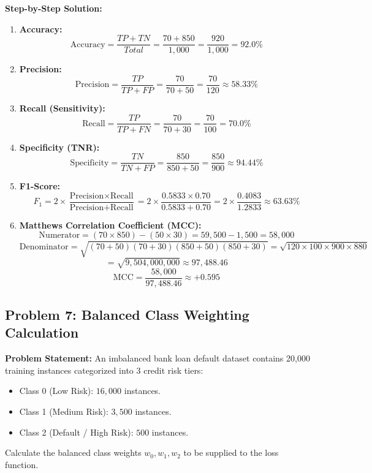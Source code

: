\textbf{Step-by-Step Solution:}
\begin{enumerate}[label=(\alph*)]
    \item \textbf{Accuracy:}
    \[
    \text{Accuracy} = \frac{TP + TN}{Total} = \frac{70 + 850}{1,000} = \frac{920}{1,000} = \mathbf{92.0\%}
    \]
    \item \textbf{Precision:}
    \[
    \text{Precision} = \frac{TP}{TP + FP} = \frac{70}{70 + 50} = \frac{70}{120} \approx \mathbf{58.33\%}
    \]
    \item \textbf{Recall (Sensitivity):}
    \[
    \text{Recall} = \frac{TP}{TP + FN} = \frac{70}{70 + 30} = \frac{70}{100} = \mathbf{70.0\%}
    \]
    \item \textbf{Specificity (TNR):}
    \[
    \text{Specificity} = \frac{TN}{TN + FP} = \frac{850}{850 + 50} = \frac{850}{900} \approx \mathbf{94.44\%}
    \]
    \item \textbf{F1-Score:}
    \[
    F_1 = 2 \times \frac{\text{Precision} \times \text{Recall}}{\text{Precision} + \text{Recall}} = 2 \times \frac{0.5833 \times 0.70}{0.5833 + 0.70} = 2 \times \frac{0.4083}{1.2833} \approx \mathbf{63.63\%}
    \]
    \item \textbf{Matthews Correlation Coefficient (MCC):}
    \[
    \text{Numerator} = (70 \times 850) - (50 \times 30) = 59,500 - 1,500 = 58,000
    \]
    \[
    \text{Denominator} = \sqrt{(70 + 50)(70 + 30)(850 + 50)(850 + 30)} = \sqrt{120 \times 100 \times 900 \times 880}
    \]
    \[
    = \sqrt{9,504,000,000} \approx 97,488.46
    \]
    \[
    \text{MCC} = \frac{58,000}{97,488.46} \approx \mathbf{+0.595}
    \]
\end{enumerate}

\subsection*{Problem 7: Balanced Class Weighting Calculation}
\textbf{Problem Statement:} An imbalanced bank loan default dataset contains 20,000 training instances categorized into 3 credit risk tiers:
\begin{itemize}
    \item Class 0 (Low Risk): $16,000$ instances.
    \item Class 1 (Medium Risk): $3,500$ instances.
    \item Class 2 (Default / High Risk): $500$ instances.
\end{itemize}
Calculate the balanced class weights $w_0, w_1, w_2$ to be supplied to the loss function.

